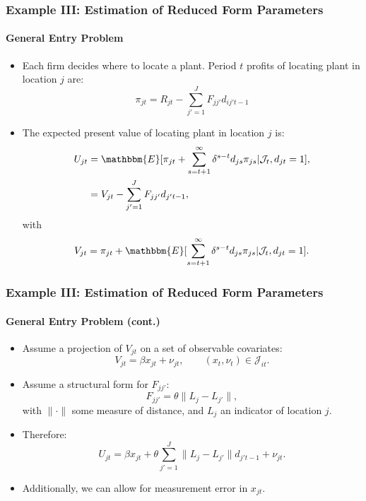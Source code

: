 \documentclass[10pt,letterpaper]{beamer}
\begin{document}
\begin{frame}
\frametitle{Example III: Estimation of Reduced Form Parameters}
\framesubtitle{General Entry Problem}

\begin{itemize}
	\item Each firm decides where to locate a plant. Period $t$ profits of locating plant in location $j$ are:
	\begin{equation*}
	\pi_{jt} = R_{jt}-\sum_{j'=1}^{J}F_{jj'}d_{ij't-1}
	\end{equation*}
	\item The expected present value of locating plant in location $j$ is:
	\begin{align*}
	U_{jt}&=\mathbbm{E}[\pi_{jt}+\sum_{s=t+1}^{\infty}\delta^{s-t}d_{js}\pi_{js}|\mathcal{J}_{t},d_{jt}=1],\\
	&=V_{jt}-\sum_{j'=1}^{J}F_{jj'}d_{j't-1},
	\end{align*}
	with
	\begin{equation*}
	V_{jt}=\pi_{jt}+\mathbbm{E}[\sum_{s=t+1}^{\infty}\delta^{s-t}d_{js}\pi_{js}|\mathcal{J}_{t},d_{jt}=1].
	\end{equation*}
\end{itemize}
\end{frame}
\begin{frame}
\frametitle{Example III: Estimation of Reduced Form Parameters}
\framesubtitle{General Entry Problem (cont.)}

\begin{itemize}
	\item Assume a projection of $V_{jt}$ on a set of observable covariates:
	\begin{equation*}
	V_{jt}=\beta x_{jt} + \nu_{jt},\qquad(x_{t},\nu_{t})\in\mathcal{J}_{it}.
	\end{equation*}
	\item Assume a structural form for $F_{jj'}$:
	\begin{equation*}
	F_{jj'}=\theta\|L_{j}-L_{j'}\|,
	\end{equation*}
	with $\|\cdot\|$ some measure of distance, and $L_{j}$ an indicator of location $j$.
	\item Therefore:
	\begin{equation*}
	U_{jt}=\beta x_{jt}+\theta\sum_{j'=1}^{J}\|L_{j}-L_{j'}\|d_{j't-1}+\nu_{jt}.
	\end{equation*}
	\item Additionally, we can allow for measurement error in $x_{jt}$.
\end{itemize}
\end{frame}
\end{document}
